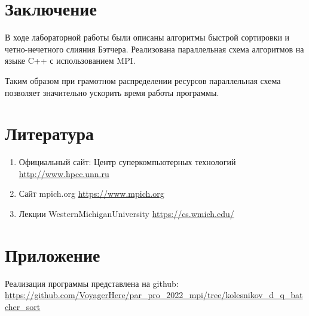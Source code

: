 \documentclass[oneside,final,14pt]{extreport}
\begin{document}
\chapter{Заключение}
В ходе лабораторной работы были описаны алгоритмы быстрой сортировки и четно-нечетного слияния Бэтчера. Реализована параллельная схема алгоритмов на языке C++ с использованием MPI.
\bigskip

Таким образом при грамотном распределении ресурсов параллельная схема позволяет значительно ускорить время работы программы. 
\chapter{Литература}
\begin{enumerate}
    \item Официальный сайт: Центр суперкомпьютерных технологий
    \url{http://www.hpcc.unn.ru}
    \item Сайт mpich.org \url{https://www.mpich.org}
    \item Лекции WesternMichiganUniversity \url{https://cs.wmich.edu/}
\end{enumerate}
\chapter{Приложение}
Реализация программы представлена на github:
\url{https://github.com/VoyagerHere/par_pro_2022_mpi/tree/kolesnikov_d_q_batcher_sort}
\end{document}

